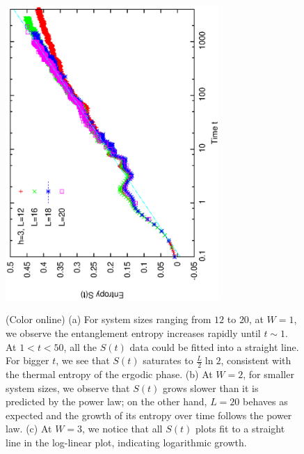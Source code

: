 \documentclass[prl,aps,epsf,showpacs,twocolumn]{revtex4}
\begin{document}
\begin{figure}[b]
  \includegraphics[angle=-90,width=3.2in]{newfig1e.ps}\\
  \vspace{0.12in}
  \caption{(Color online) (a) 
    For system sizes ranging from $12$ to $20$, at $W=1$, we observe the
    entanglement entropy increases rapidly until $t \sim 1$.
    At $1<t<50$, all the $S(t)$ data could be fitted into a straight line.
    For bigger $t$, we see that $S(t)$ saturates to $\frac{L}{2} \ln{2}$,
    consistent with the thermal entropy of the ergodic phase.
    (b) At $W=2$, for smaller system sizes, we observe that $S(t)$ grows slower
    than it is predicted by the power law; on the other hand, $L=20$ behaves as
    expected and the growth of its entropy over time follows the power law.
    (c) At $W=3$, we notice that all $S(t)$ plots fit to a straight line in the
    log-linear plot, indicating logarithmic growth.
  }
\label{fig3}
\end{figure}
\end{document}
